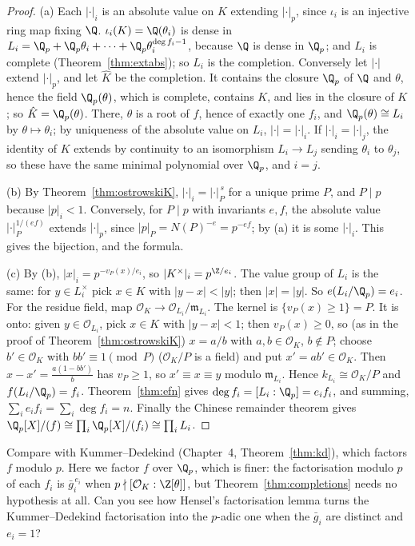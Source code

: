 \begin{proof}
(a) Each $|\cdot|_i$ is an absolute value on $K$ extending $|\cdot|_p$, since $\iota_i$ is an injective ring map fixing $\Q$.
$\iota_i(K)=\Q(\theta_i)$ is dense in $L_i=\Q_p+\Q_p\theta_i+\dots+\Q_p\theta_i^{\deg f_i-1}$, because $\Q$ is dense in $\Q_p$; and $L_i$
is complete (Theorem~\ref{thm:extabs}); so $L_i$ is the completion. Conversely let $|\cdot|$ extend $|\cdot|_p$, and let $\hat K$ be
the completion. It contains the closure $\Q_p$ of $\Q$ and $\theta$, hence the field $\Q_p(\theta)$, which is complete, contains
$K$, and lies in the closure of $K$; so $\hat K=\Q_p(\theta)$. There, $\theta$ is a root of $f$, hence of exactly one $f_i$, and
$\Q_p(\theta)\cong L_i$ by $\theta\mapsto\theta_i$; by uniqueness of the absolute value on $L_i$, $|\cdot|=|\cdot|_i$. If
$|\cdot|_i=|\cdot|_j$, the identity of $K$ extends by continuity to an isomorphism $L_i\to L_j$ sending $\theta_i$ to $\theta_j$, so
these have the same minimal polynomial over $\Q_p$, and $i=j$.

(b) By Theorem~\ref{thm:ostrowskiK}, $|\cdot|_i=|\cdot|_P^{\,s}$ for a unique prime $P$, and $P\mid p$ because $|p|_i<1$.
Conversely, for $P\mid p$ with invariants $e,f$, the absolute value $|\cdot|_P^{1/(ef)}$ extends $|\cdot|_p$, since $|p|_P=N(P)^{-e}=
p^{-ef}$; by (a) it is some $|\cdot|_i$. This gives the bijection, and the formula.

(c) By (b), $|x|_i=p^{-v_P(x)/e_i}$, so $|K^\times|_i=p^{\Z/e_i}$. The value group of $L_i$ is the same: for $y\in L_i^\times$ pick
$x\in K$ with $|y-x|<|y|$; then $|x|=|y|$. So $e(L_i/\Q_p)=e_i$. For the residue field, map $\mathcal O_K\to\mathcal O_{L_i}/\mathfrak
m_{L_i}$. The kernel is $\{v_P(x)\ge1\}=P$. It is onto: given $y\in\mathcal O_{L_i}$, pick $x\in K$ with $|y-x|<1$; then
$v_P(x)\ge0$, so (as in the proof of Theorem~\ref{thm:ostrowskiK}) $x=a/b$ with $a,b\in\mathcal O_K$, $b\notin P$; choose $b'\in\mathcal
O_K$ with $bb'\equiv1\pmod P$ ($\mathcal O_K/P$ is a field) and put $x'=ab'\in\mathcal O_K$. Then $x-x'=\frac{a(1-bb')}{b}$ has
$v_P\ge1$, so $x'\equiv x\equiv y$ modulo $\mathfrak m_{L_i}$. Hence $k_{L_i}\cong\mathcal O_K/P$ and $f(L_i/\Q_p)=f_i$.
Theorem~\ref{thm:efn} gives $\deg f_i=[L_i:\Q_p]=e_if_i$, and summing, $\sum_ie_if_i=\sum_i\deg f_i=n$. Finally the Chinese
remainder theorem gives $\Q_p[X]/(f)\cong\prod_i\Q_p[X]/(f_i)\cong\prod_iL_i$.
\end{proof}

\begin{think}
Compare with Kummer--Dedekind (Chapter~4, Theorem~\ref{thm:kd}), which factors $f$ modulo $p$. Here we factor $f$ over $\Q_p$,
which is finer: the factorisation modulo $p$ of each $f_i$ is $\bar g_i^{\,e_i}$ when $p\nmid[\mathcal O_K:\Z[\theta]]$, but Theorem~\ref{thm:completions}
needs no hypothesis at all. Can you see how Hensel's factorisation lemma turns the Kummer--Dedekind factorisation into the
$p$-adic one when the $\bar g_i$ are distinct and $e_i=1$?
\end{think}

